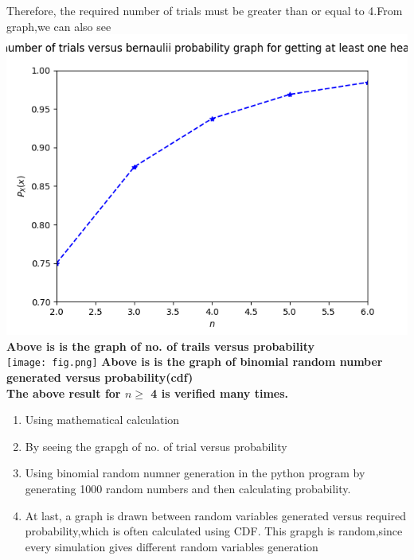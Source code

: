 \documentclass[journel,12pt,twocoloums]{IEEEtran}
\begin{document}
Therefore, the required number of trials must be greater than or equal to 4.From graph,we can also see\\

\includegraphics[width=\columnwidth] {Figure_1.png}
\textbf{Above is is the graph of no. of trails versus probability }\\ \texttt{[image: fig.png]}
\textbf{Above is is the graph of binomial random number generated versus probability(cdf)}\\ 


\textbf{The above result for $n\ge$ 4 is verified many times.}\\
\begin{enumerate}
\item
Using mathematical calculation
\item
By seeing the grapgh of no. of trial versus probability

\item
Using binomial random numner generation in the python program by generating 1000 random numbers and then calculating probability.

\item
At last, a graph is drawn between random variables generated versus required probability,which is often calculated using CDF. This grapgh is random,since every simulation gives different random variables generation
\end{enumerate}
\end{document}
